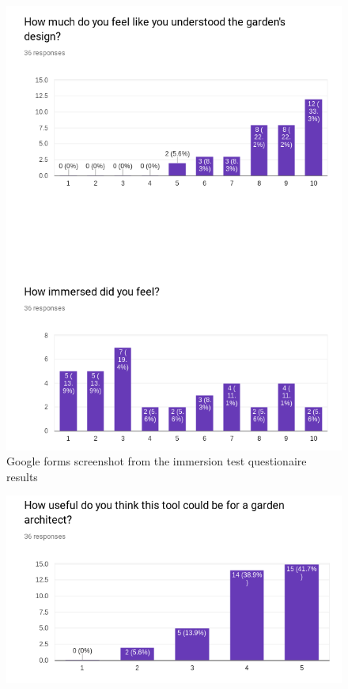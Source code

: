 \begin{multicols}{2}
\begin{figure}[H]
		\includegraphics[width=1.0\linewidth]{include/Appendices/immersionQuestionnaire/4.png}
		\caption{Google forms screenshot from the immersion test questionaire results}
	\end{figure}
	\begin{figure}[H]
		\includegraphics[width=1.0\linewidth]{include/Appendices/immersionQuestionnaire/5.png}

\end{figure}
\end{multicols}
